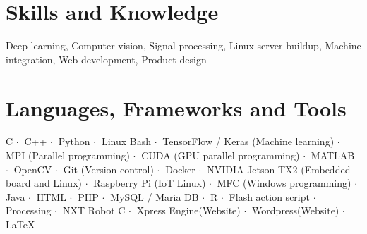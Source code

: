 \documentclass[letterpaper,11pt]{article}
\newcommand{\resumeItem}[2]{
  \item\small{
    \textbf{#1}{: #2 \vspace{-2pt}}
  }
}
\newcommand{\resumeSubItem}[2]{\resumeItem{#1}{#2}\vspace{-4pt}}
\newcommand{\resumeSubHeadingListStart}{\begin{itemize}[leftmargin=*]}
\newcommand{\resumeSubHeadingListEnd}{\end{itemize}}
\begin{document}
  
\section{Skills and Knowledge}
  Deep learning, Computer vision, Signal processing, Linux server buildup, Machine integration, Web development, Product design
  
\section{Languages, Frameworks and Tools}
  C $\cdot \ $ C++ $\cdot \ $ Python $\cdot \ $ Linux Bash $\cdot \ $ TensorFlow / Keras (Machine learning) $\cdot \ $ MPI (Parallel programming) $\cdot \ $ CUDA (GPU parallel programming) $\cdot \ $ MATLAB $\cdot \ $ OpenCV $\cdot \ $ Git (Version control) $\cdot \ $ Docker $\cdot \ $ NVIDIA Jetson TX2 (Embedded board and Linux) $\cdot \ $ Raspberry Pi (IoT Linux) $\cdot \ $ MFC (Windows programming) $\cdot \ $ Java $\cdot \ $ HTML $\cdot \ $ PHP $\cdot \ $ MySQL / Maria DB $\cdot \ $ R $\cdot \ $ Flash action script $\cdot \ $ Processing $\cdot \ $ NXT Robot C $\cdot \ $ Xpress Engine(Website) $\cdot \ $ Wordpress(Website) $\cdot \ $ \LaTeX
  
  

%

\end{document}
